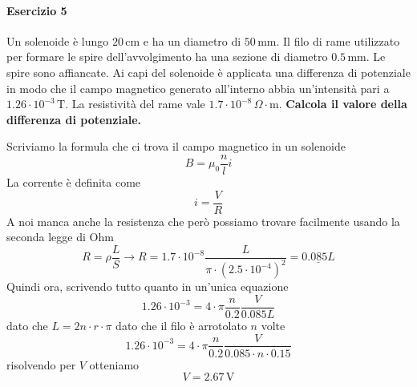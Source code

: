 \paragraph{Esercizio 5}
Un solenoide è lungo $20\,\text{cm}$ e ha un diametro di $50\,\text{mm}$. Il filo di rame 
utilizzato per formare le spire dell'avvolgimento ha una sezione di diametro $0.5\,\text{mm}$.
Le spire sono affiancate. Ai capi del solenoide è applicata una differenza di potenziale in
modo che il campo magnetico generato all'interno abbia un'intensità pari a $1.26\cdot10^{-3}\,
\text{T}$. La resistività del rame vale $1.7\cdot10^{-8}\,\Omega\cdot\text{m}$. \textbf{Calcola
il valore della differenza di potenziale.} 
\divisor

Scriviamo la formula che ci trova il campo magnetico in un solenoide
\begin{equation*}
  B = \mu_0 \frac{n}{l}i
\end{equation*}
La corrente è definita come
\begin{equation*}
  i = \frac{V}{R}
\end{equation*}
A noi manca anche la resistenza che però possiamo trovare facilmente usando la seconda legge di
Ohm
\begin{equation*}
  R = \rho \frac{L}{S} \rightarrow R = 1.7\cdot10^{-8} \frac{L}{\pi\cdot (2.5\cdot10^{-4})^2} =
  \underline{0.085L} 
\end{equation*}
Quindi ora, scrivendo tutto quanto in un'unica equazione
\begin{equation*}
  1.26\cdot10^{-3} = 4\cdot\pi \frac{n}{0.2}\frac{V}{0.085L}
\end{equation*}
dato che $L = 2n\cdot r\cdot\pi$ dato che il filo è arrotolato $n$ volte
\begin{equation*}
  1.26\cdot10^{-3} = 4\cdot\pi \frac{n}{0.2}\frac{V}{0.085\cdot n\cdot 0.15}
\end{equation*}
risolvendo per $V$ otteniamo
\begin{equation*}
  V = \boxed{2.67\,\text{V}}
\end{equation*}
